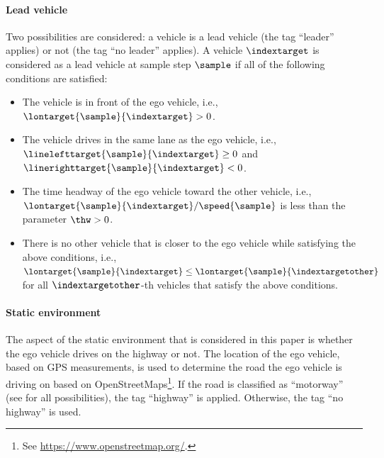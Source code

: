 \paragraph{Lead vehicle}
\label{sec:lead vehicle}

Two possibilities are considered: a vehicle is a lead vehicle (the tag ``leader'' applies) or not (the tag ``no leader'' applies). A vehicle $\indextarget$ is considered as a lead vehicle at sample step $\sample$ if all of the following conditions are satisfied:
\begin{itemize}
	\item The vehicle is in front of the ego vehicle, i.e., $\lontarget{\sample}{\indextarget}>0$.
	\item The vehicle drives in the same lane as the ego vehicle, i.e., $\linelefttarget{\sample}{\indextarget} \geq 0$ and $\linerighttarget{\sample}{\indextarget} < 0$.
	\item The time headway of the ego vehicle toward the other vehicle, i.e., $\lontarget{\sample}{\indextarget}/\speed{\sample}$ is less than the parameter $\thw>0$.
	\item There is no other vehicle that is closer to the ego vehicle while satisfying the above conditions, i.e., $\lontarget{\sample}{\indextarget} \leq \lontarget{\sample}{\indextargetother}$ for all $\indextargetother$-th vehicles that satisfy the above conditions.
\end{itemize}



\paragraph{Static environment}
\label{sec:static environment}

The aspect of the static environment that is considered in this paper is whether the ego vehicle drives on the highway or not. The location of the ego vehicle, based on GPS measurements, is used to determine the road the ego vehicle is driving on based on OpenStreetMaps\footnote{See \url{https://www.openstreetmap.org/}.}. If the road is classified as ``motorway'' (see \autocite{osm_highway} for all possibilities), the tag ``highway'' is applied. Otherwise, the tag ``no highway'' is used.

